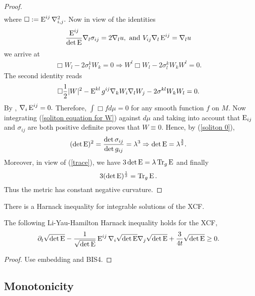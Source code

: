 \documentclass[a4paper, 12pt]{amsart}
\begin{document}
\begin{proof}
\begin{align}
\end{align}
where \(\Box:=\operatorname{E}^{ij}\nabla^2_{i,j}.\)
Now in view of the identities
\begin{equation}\label{eq0}
\frac{\operatorname{E}^{ij}}{\det\operatorname{E}}\nabla_l\sigma_{ij}=2\nabla_lu,~\mbox{and}~ V_{ij}\nabla_l\operatorname{E}^{ij}=\nabla_lu
\end{equation}
we arrive at
\begin{align}
\Box W_l-2\sigma_l^kW_k=0\Rightarrow W^l\Box W_l-2\sigma_l^kW_kW^l=0.
\end{align}
The second identity reads
\begin{align}\label{soliton equation for W}
\Box \frac{1}{2}|W|^2-\operatorname{E}^{kl}g^{ij}\nabla_kW_i\nabla_lW_j-2\sigma^{kl}W_kW_l=0.
\end{align}
By \cite[Lemma 1]{MR2055396}, $\nabla_i\operatorname{E}^{ij}=0.$ Therefore, $\int \Box fd\mu=0$ for any smooth function $f$ on $M$.
Now integrating (\ref{soliton equation for W}) against $d\mu$ and taking into account that $\operatorname{E}_{ij}$ and $\sigma_{ij}$ are both positive definite proves that $W\equiv0$. Hence, by (\ref{soliton 0}),
\[(\det\operatorname{E})^2=\frac{\det \sigma_{ij}}{\det g_{ij}}=\lambda ^3\Rightarrow \det\operatorname{E}=\lambda^{\frac{3}{2}}.\]
Moreover, in view of (\ref{trace}), we have $3\det\operatorname{E}=\lambda \operatorname{Tr}_g \operatorname{E}$ and finally \[3(\det\operatorname{E})^{\frac{1}{3}}=\operatorname{Tr}_g \operatorname{E}.\] Thus the metric has constant negative curvature.
\end{proof}
There is a Harnack inequality for integrable solutions of the XCF.
\begin{thm}
\label{thm:harnack}
The following Li-Yau-Hamilton Harnack inequality holds for the XCF,
\[
\partial_t \sqrt{\det\operatorname{E}}-\frac{1}{\sqrt{\det\operatorname{E}}}\operatorname{E}^{ij}\nabla_i\sqrt{\det\operatorname{E}}\nabla_j\sqrt{\det\operatorname{E}}+\frac{3}{4t}\sqrt{\det\operatorname{E}}\geq0.
\]
\end{thm}
\begin{proof}
{\color{red}Use embedding and BIS4.}
\end{proof}
\subsection{Monotonicity}
\label{subsec:xcf_volume}
\end{document}
